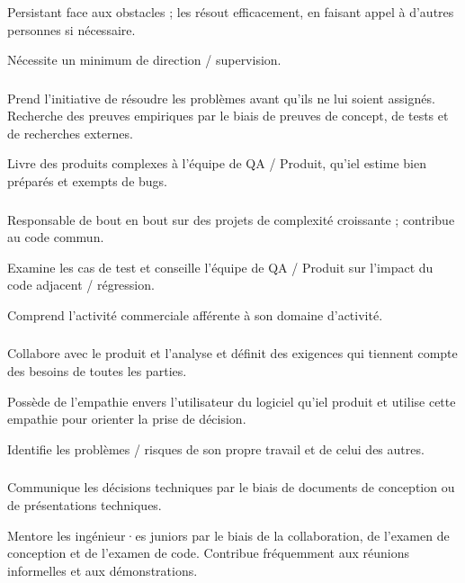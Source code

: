 \documentclass[a4paper, french, openany, 12pt]{book}
\newcommand\str{\textcolor{DarkOrchid}{\textbf{\bsc{Str}}}}
\newcommand\wis{\textcolor{MidnightBlue}{\textbf{\bsc{Wis}}}}
\newcommand\cha{\textcolor{RawSienna}{\textbf{\bsc{Cha}}}}
\begin{document}
Persistant face aux obstacles ; les résout efficacement, en faisant appel à d'autres personnes si nécessaire. 

Nécessite un minimum de direction / supervision.

\subsubsection*{\str}

Prend l'initiative de résoudre les problèmes avant qu'ils ne lui soient assignés. 
Recherche des preuves empiriques par le biais de preuves de concept, de tests et de recherches externes.

Livre des produits complexes à l'équipe de QA / Produit, qu'iel estime bien préparés et exempts de bugs.

\subsubsection*{\wis}

Responsable de bout en bout sur des projets de complexité croissante ; contribue au code commun.

Examine les cas de test et conseille l'équipe de QA / Produit sur l'impact du code adjacent / régression.

Comprend l'activité commerciale afférente à son domaine d'activité.

\subsubsection*{\wis}

Collabore avec le produit et l'analyse et définit des exigences qui tiennent compte des besoins de toutes les parties.

Possède de l'empathie envers l'utilisateur du logiciel qu'iel produit et utilise cette empathie pour orienter la prise 
de décision.

Identifie les problèmes / risques de son propre travail et de celui des autres.

\subsubsection*{\cha}

Communique les décisions techniques par le biais de documents de conception ou de présentations techniques.

Mentore les ingénieur·es juniors par le biais de la collaboration, de l'examen de conception et de l'examen de code. 
Contribue fréquemment aux réunions informelles et aux démonstrations.
\end{document}
